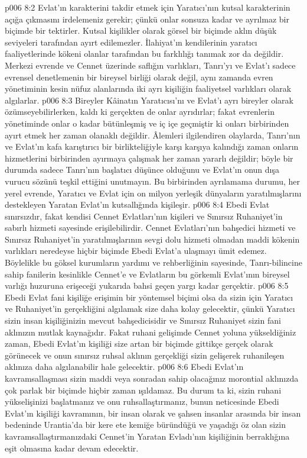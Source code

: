 \vs p006 8:2 Evlat’ın karakterini takdir etmek için Yaratıcı’nın kutsal karakterinin açığa çıkmasını irdelemeniz gerekir; çünkü onlar sonsuza kadar ve ayrılmaz bir biçimde bir tektirler. Kutsal kişilikler olarak görsel bir biçimde aklın düşük seviyeleri tarafından ayırt edilemezler. İlahiyat’ın kendilerinin yaratıcı faaliyetlerinde kökeni olanlar tarafından bu farklılığı tanımak zor da değildir. Merkezi evrende ve Cennet üzerinde saflığın varlıkları, Tanrı’yı ve Evlat’ı sadece evrensel denetlemenin bir bireysel birliği olarak değil, aynı zamanda evren yönetiminin kesin nüfuz alanlarında iki ayrı kişiliğin faaliyetsel varlıkları olarak algılarlar.
\vs p006 8:3 Bireyler Kâinatın Yaratıcısı’nı ve Evlat’ı ayrı bireyler olarak özümseyebilirlerken, kaldı ki gerçekten de onlar ayrıdırlar; fakat evrenlerin yönetiminde onlar o kadar bütünleşmiş ve iç içe geçmiştir ki onları birbirinden ayırt etmek her zaman olanaklı değildir. Âlemleri ilgilendiren olaylarda, Tanrı’nın ve Evlat’ın kafa karıştırıcı bir birlikteliğiyle karşı karşıya kalındığı zaman onların hizmetlerini birbirinden ayırmaya çalışmak her zaman yararlı değildir; böyle bir durumda sadece Tanrı’nın başlatıcı düşünce olduğunu ve Evlat’ın onun dışa vurucu sözünü teşkil ettiğini unutmayın. Bu birbirinden ayrılamama durumu, her yerel evrende, Yaratıcı ve Evlat için on milyon yerleşik dünyaların yaratılmışlarını destekleyen Yaratan Evlat’ın kutsallığında kişileşir.
\vs p006 8:4 Ebedi Evlat sınırsızdır, fakat kendisi Cennet Evlatları’nın kişileri ve Sınırsız Ruhaniyet’in sabırlı hizmeti sayesinde erişilebilirdir. Cennet Evlatları’nın bahşedici hizmeti ve Sınırsız Ruhaniyet’in yaratılmışlarının sevgi dolu hizmeti olmadan maddi kökenin varlıkları neredeyse hiçbir biçimde Ebedi Evlat’a ulaşmayı ümit edemez. Böylelikle bu göksel kurumların yardımı ve rehberliğinin sayesinde, Tanrı\hyp{}bilincine sahip fanilerin kesinlikle Cennet’e ve Evlatların bu görkemli Evlat’ının bireysel varlığı huzuruna erişeceği yukarıda bahsi geçen yargı kadar gerçektir.
\vs p006 8:5 Ebedi Evlat fani kişiliğe erişimin bir yöntemsel biçimi olsa da sizin için Yaratıcı ve Ruhaniyet’in gerçekliğini algılamak size daha kolay gelecektir, çünkü Yaratıcı sizin insan kişiliğinizin mevcut bahşedicisidir ve Sınırsız Ruhaniyet sizin fani aklınızın mutlak kaynağıdır. Fakat ruhani gelişimde Cennet yoluna yükseldiğiniz zaman, Ebedi Evlat’ın kişiliği size artan bir biçimde gittikçe gerçek olarak görünecek ve onun sınırsız ruhsal aklının gerçekliği sizin gelişerek ruhanileşen aklınıza daha algılanabilir hale gelecektir.
\vs p006 8:6 Ebedi Evlat’ın kavramsallaşması sizin maddi veya sonradan sahip olacağınız morontial aklınızda çok parlak bir biçimde hiçbir zaman ışıldamaz. Bu durum ta ki, sizin ruhani yükselişinizi başlatmanız ve onu ruhsallaştırmanız, bunun neticesinde Ebedi Evlat’ın kişiliği kavramının, bir insan olarak ve şahsen insanlar arasında bir insan bedeninde Urantia’da bir kere ete kemiğe büründüğü ve yaşadığı öz olan sizin kavramsallaştırmanızdaki Cennet’in Yaratan Evladı’nın kişiliğinin berraklığına eşit olmasına kadar devam edecektir.
